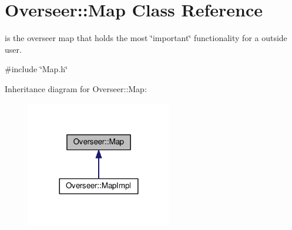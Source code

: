 \hypertarget{classOverseer_1_1Map}{}\section{Overseer\+:\+:Map Class Reference}
\label{classOverseer_1_1Map}


is the overseer map that holds the most \char`\"{}important\char`\"{} functionality for a outside user.  




{\ttfamily \#include \char`\"{}Map.\+h\char`\"{}}



Inheritance diagram for Overseer\+:\+:Map\+:
\nopagebreak
\begin{figure}[H]
\begin{center}
\leavevmode
\includegraphics[width=180pt]{classOverseer_1_1Map__inherit__graph}
\end{center}
\end{figure}
